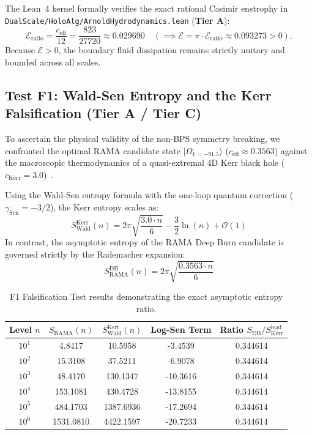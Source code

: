 \documentclass[11pt,a4paper]{article}
\theoremstyle{plain}
\theoremstyle{definition}
\theoremstyle{remark}
\newcommand{\tierA}{\textbf{Tier A}}
\newcommand{\tierC}{\textbf{Tier C}}
\begin{document}
The Lean~4 kernel formally verifies the exact rational Casimir enstrophy in \texttt{DualScale/HoloAlg/ArnoldHydrodynamics.lean} (\tierA{}):
\begin{equation}
  \mathcal{E}_{\mathrm{ratio}} = \frac{c_{\mathrm{eff}}}{12} = \frac{823}{27720} \approx 0.029690 \quad (\implies \mathcal{E} = \pi \cdot \mathcal{E}_{\mathrm{ratio}} \approx 0.093273 > 0).
\end{equation}
Because $\mathcal{E} > 0$, the boundary fluid dissipation remains strictly unitary and bounded across all scales.

\subsection{Test F1: Wald-Sen Entropy and the Kerr Falsification (\tierA{} / \tierC{})}

To ascertain the physical validity of the non-BPS symmetry breaking, we confronted the optimal RAMA candidate state $|\Omega_{k=-91.5}\rangle$ ($c_{\mathrm{eff}} \approx 0.3563$) against the macroscopic thermodynamics of a quasi-extremal 4D Kerr black hole ($c_{\mathrm{Kerr}} = 3.0$)~\cite{Sen2012,Wald1993,Guica2008}.

Using the Wald-Sen entropy formula with the one-loop quantum correction ($\gamma_{\mathrm{Sen}} = -3/2$), the Kerr entropy scales as:
\begin{equation}
S_{\mathrm{Wald}}^{\mathrm{Kerr}}(n) = 2\pi\sqrt{\frac{3.0 \cdot n}{6}} - \frac{3}{2} \ln(n) + \mathcal{O}(1)
\end{equation}
In contrast, the asymptotic entropy of the RAMA Deep Burn candidate is governed strictly by the Rademacher expansion:
\begin{equation}
S_{\mathrm{RAMA}}^{\mathrm{DB}}(n) = 2\pi\sqrt{\frac{0.3563 \cdot n}{6}}
\end{equation}

\begin{table}[h]
\centering
\begin{tabular}{ccccc}
\toprule
Level $n$ & $S_{\mathrm{RAMA}}(n)$ & $S_{\mathrm{Wald}}^{\mathrm{Kerr}}(n)$ & Log-Sen Term & Ratio $S_{\mathrm{DB}}/S_{\mathrm{Kerr}}^{\mathrm{lead}}$ \\
\midrule
$10^1$ & 4.8417 & 10.5958 & -3.4539 & 0.344614 \\
$10^2$ & 15.3108 & 37.5211 & -6.9078 & 0.344614 \\
$10^3$ & 48.4170 & 130.1347 & -10.3616 & 0.344614 \\
$10^4$ & 153.1081 & 430.4728 & -13.8155 & 0.344614 \\
$10^5$ & 484.1703 & 1387.6936 & -17.2694 & 0.344614 \\
$10^6$ & 1531.0810 & 4422.1597 & -20.7233 & 0.344614 \\
\bottomrule
\end{tabular}
\caption{F1 Falsification Test results demonstrating the exact asymptotic entropy ratio.}
\label{tab:f1_wald}
\end{table}
\end{document}
